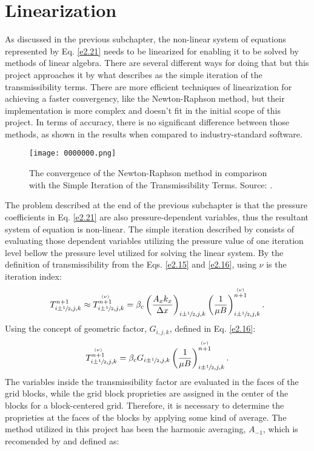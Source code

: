 \section{Linearization}
\label{linearization}
As discussed in the previous subchapter, the non-linear system of equations represented by Eq. \ref{e2.21} needs to be linearized for enabling it to be solved by methods of linear algebra. There are several different ways for doing that but this project approaches it by what \cite{Ertekin2001} describes as the simple iteration of the transmissibility terms. There are more efficient techniques of linearization for achieving a faster convergency, like the Newton-Raphson method, but their implementation is more complex and doesn't fit in the initial scope of this project. In terms of accuracy, there is no significant difference between those methods, as shown in the results when compared to industry-standard software.
	\begin{figure}[H]
	\centering
	\texttt{[image: 0000000.png]}\\
	\caption{The convergence of the Newton-Raphson method in comparison with the Simple Iteration of the Transmissibility Terms. Source: \cite{Ertekin2001}.}
	\label{fig:0000}
	\end{figure}
The problem described at the end of the previous subchapter is that the pressure coefficients in Eq. \ref{e2.21} are also pressure-dependent variables, thus the resultant system of equation is non-linear. The simple iteration described by \cite{Ertekin2001} consists of evaluating those dependent variables utilizing the pressure value of one iteration level bellow the pressure level utilized for solving the linear system. By the definition of transmissibility from the Eqs. \ref{e2.15} and \ref{e2.16}, using $\nu$ is the iteration index:
	\begin{align}
	\label{e2.22}
	T^{n+1}_{i\pm \sfrac{1}{2},j,k} \approx T^{\stackrel{(\nu)}{n+1}}_{i\pm \sfrac{1}{2},j,k}= \beta_c\left(\frac{A_x k_x}{\Delta x}\right)_{i\pm \sfrac{1}{2},j,k}\left( \frac{1}{\mu B}\right)_{i\pm \sfrac{1}{2},j,k}^{\stackrel{(\nu)}{n+1}}.
	\end{align}
Using the concept of geometric factor, $G_{i,j,k}$, defined in Eq. \ref{e2.16}:
	\begin{align}
	\label{e2.23}
	T^{\stackrel{(\nu)}{n+1}}_{i\pm \sfrac{1}{2},j,k}= \beta_c G_{i\pm \sfrac{1}{2},j,k}\left( \frac{1}{\mu B}\right)_{i\pm 	\sfrac{1}{2},j,k}^{\stackrel{(\nu)}{n+1}}.
	\end{align}
The variables inside the transmissibility factor are evaluated in the faces of the grid blocks, while the grid block proprieties are assigned in the center of the blocks for a block-centered grid. Therefore, it is necessary to determine the proprieties at the faces of the blocks by applying some kind of average. The method utilized in this project has been the harmonic averaging, $A_{-1}$, which is recomended by \cite{Ertekin2001} and defined as:
